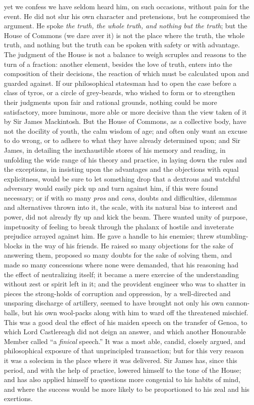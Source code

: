 yet we confess we have seldom heard him, on such occasions,
without pain for the event. He did not slur his own character and
pretensions, but he compromised the argument. He spoke \emph{the
truth, the whole truth, and nothing but the truth}; but the House
of Commons (we dare aver it) is not the place where the truth, the
whole truth, and nothing but the truth can be spoken with safety
or with advantage. The judgment of the House is not a balance to
weigh scruples and reasons to the turn of a fraction: another
element, besides the love of truth, enters into the composition of
their decisions, the reaction of which must be calculated upon and
guarded against. If our philosophical statesman had to open the
case before a class of tyros, or a circle of grey-beards, who
wished to form or to strengthen their judgments upon fair and
rational grounds, nothing could be more satisfactory, more
luminous, more able or more decisive than the view taken of it by
Sir James Mackintosh. But the House of Commons, as a collective
body, have not the docility of youth, the calm wisdom of age; and
often only want an excuse to do wrong, or to adhere to what they
have already determined upon; and Sir James, in detailing the
inexhaustible stores of his memory and reading, in unfolding the
wide range of his theory and practice, in laying down the rules
and the exceptions, in insisting upon the advantages and the
objections with equal explicitness, would be sure to let something
drop that a dextrous and watchful adversary would easily pick up
and turn against him, if this were found necessary; or if with so
many \emph{pros} and \emph{cons}, doubts and difficulties,
dilemmas and alternatives thrown into it, the scale, with its
natural bias to interest and power, did not already fly up and
kick the beam. There wanted unity of purpose, impetuosity of
feeling to break through the phalanx of hostile and inveterate
prejudice arrayed against him. He gave a handle to his enemies;
threw stumbling-blocks in the way of his friends. He raised so
many objections for the sake of answering them, proposed so many
doubts for the sake of solving them, and made so many concessions
where none were demanded, that his reasoning had the effect of
neutralizing itself; it became a mere exercise of the
understanding without zest or spirit left in it; and the provident
engineer who was to shatter in pieces the strong-holds of
corruption and oppression, by a well-directed and unsparing
discharge of artillery, seemed to have brought not only his own
cannon-balls, but his own wool-packs along with him to ward off
the threatened mischief. This was a good deal the effect of his
maiden speech on the transfer of Genoa, to which Lord Castlereagh
did not deign an answer, and which another Honourable Member
called ``a \emph{finical} speech.'' It was a most able, candid,
closely argued, and philosophical exposure of that unprincipled
transaction; but for this very reason it was a solecism in the
place where it was delivered. Sir James has, since this period,
and with the help of practice, lowered himself to the tone of the
House; and has also applied himself to questions more congenial to
his habits of mind, and where the success would be more likely to
be proportioned to his zeal and his exertions.

